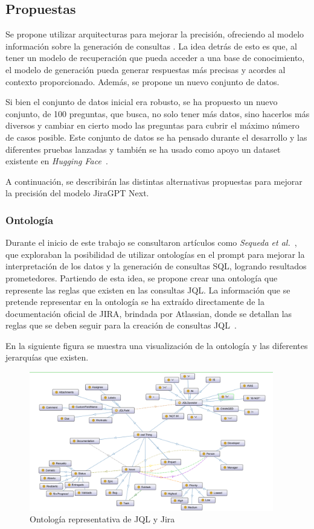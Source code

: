 \subsection{Propuestas}
Se propone utilizar arquitecturas  para mejorar la precisión, ofreciendo al modelo información sobre la generación de consultas . La idea detrás de esto es que, al tener un modelo de recuperación que pueda acceder a una base de conocimiento, el modelo de generación pueda generar respuestas más precisas y acordes al contexto proporcionado. Además, se propone un nuevo conjunto de datos.

Si bien el conjunto de datos inicial era robusto, se ha propuesto un nuevo conjunto, de 100 preguntas, que busca, no solo tener más datos, sino hacerlos más diversos y cambiar en cierto modo las preguntas para cubrir el máximo número de casos posible. Este conjunto de datos se ha pensado durante el desarrollo y las diferentes pruebas lanzadas y también se ha usado como apoyo un dataset existente en \textit{Hugging Face}~\cite{datasetHF}.

A continuación, se describirán las distintas alternativas propuestas para mejorar la precisión del modelo JiraGPT Next.

\subsubsection{Ontología}
Durante el inicio de este trabajo se consultaron artículos como \textit{Sequeda et al.}~\cite{sequeda2023benchmark}, que exploraban la posibilidad de utilizar ontologías en el prompt para mejorar la interpretación de los datos y la generación de consultas SQL, logrando resultados prometedores. Partiendo de esta idea, se propone crear una ontología que represente las reglas que existen en las consultas JQL. La información que se pretende representar en la ontología se ha extraído directamente de la documentación oficial de JIRA, brindada por Atlassian, donde se detallan las reglas que se deben seguir para la creación de consultas JQL~\cite{jiradocs}.

En la siguiente figura se muestra una visualización de la ontología y las diferentes jerarquías que existen.
\begin{figure}[H]
    \centering
    \includegraphics[width=0.95\textwidth]{images/ontologia_visualizacion.png}
    \caption{Ontología representativa de JQL y Jira}\label{fig:ontologia}
\end{figure}

